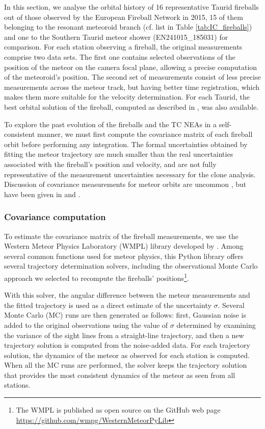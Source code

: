 \documentclass[letters,a4paper,fleqn,usenatbib]{mnras}
\begin{document}
 In this section, we analyse the orbital history of 16 representative Taurid fireballs out of those observed by the European Fireball Network in 2015, 15 of them belonging to the resonant meteoroid branch (cf. list in Table \ref{tab:IC_fireballs}) and one to the Southern Taurid meteor shower (EN241015\_185031) for comparison. For each station observing a fireball, the original measurements comprise two data sets. The first one contains selected observations of the position of the meteor on the camera focal plane, allowing a precise computation of the meteoroid's position. The second set of measurements consist of less precise measurements across the meteor track, but having better time registration, which makes them more suitable for the velocity determination. For each Taurid, the best orbital solution of the fireball, computed as described in \cite{Spurny2017}, was also available. 
 
 To explore the past evolution of the fireballs and the TC NEAs in a self-consistent manner, we must first compute the covariance matrix of each fireball orbit before performing any integration. The formal uncertainties obtained by fitting the meteor trajectory are much smaller than the real uncertainties associated with the fireball's position and velocity, and are not fully representative of the measurement uncertainties necessary for the clone analysis. Discussion of covariance measurements for meteor orbits are uncommon \citep{JansenSturgeon2019}, but have been given in \cite{Dmitriev2015} and \cite{vida2017, vida2020a}. 
 
\subsubsection{Covariance computation} \label{sec:covariance_computation}

To estimate the covariance matrix of the fireball measurements, we use the Western Meteor Physics Laboratory (WMPL) library developed by \cite{Vida2019}. Among several common functions used for meteor physics, this Python library offers several trajectory determination solvers, including the observational Monte Carlo approach we selected to recompute the fireballs' positions\footnote{The WMPL is published as open source on the GitHub web page \url{https://github.com/wmpg/WesternMeteorPyLib}}. 

With this solver, the angular difference between the meteor measurements and the fitted trajectory is used as a direct estimate of the uncertainty $\sigma$. Several Monte Carlo (MC) runs are then generated as follows: first, Gaussian noise is added to the original observations using the value of $\sigma$ determined by examining the variance of the sight lines from a straight-line trajectory, and then a new trajectory solution is computed from the noise-added data. For each trajectory solution, the dynamics of the meteor as observed for each station is computed. When all the MC runs are performed, the solver keeps the trajectory solution that provides the most consistent dynamics of the meteor as seen from all stations. 
\end{document}
